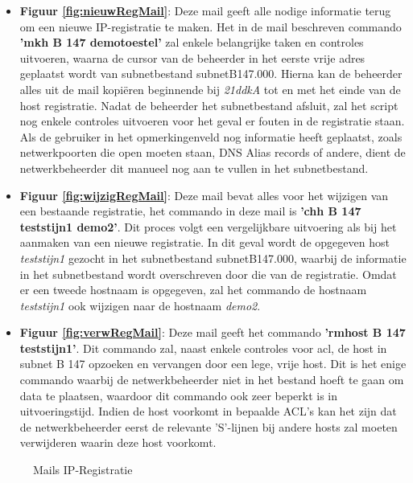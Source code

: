 \begin{itemize}
    \item \textbf{Figuur \ref{fig:nieuwRegMail}}: Deze mail geeft alle nodige informatie terug om een nieuwe IP-registratie te maken. Het in de mail beschreven commando \\\textbf{'mkh B 147 demotoestel'} zal enkele belangrijke taken en controles uitvoeren, waarna de cursor van de beheerder in het eerste vrije adres geplaatst wordt van subnetbestand subnetB147.000. Hierna kan de beheerder alles uit de mail kopiëren beginnende bij \textit{21ddkA} tot en met het einde van de host registratie. Nadat de beheerder het subnetbestand afsluit, zal het script nog enkele controles uitvoeren voor het geval er fouten in de registratie staan. Als de gebruiker in het opmerkingenveld nog informatie heeft geplaatst, zoals netwerkpoorten die open moeten staan, DNS Alias records of andere, dient de netwerkbeheerder dit manueel nog aan te vullen in het subnetbestand.
    \item \textbf{Figuur \ref{fig:wijzigRegMail}}: Deze mail bevat alles voor het wijzigen van een bestaande registratie, het commando in deze mail is \textbf{'chh B 147 teststijn1 demo2'}. Dit proces volgt een vergelijkbare uitvoering als bij het aanmaken van een nieuwe registratie. In dit geval wordt de opgegeven host \textit{teststijn1} gezocht in het subnetbestand subnetB147.000, waarbij de informatie in het subnetbestand wordt overschreven door die van de registratie. Omdat er een tweede hostnaam is opgegeven, zal het commando de hostnaam \textit{teststijn1} ook wijzigen naar de hostnaam \textit{demo2}.
    \item \textbf{Figuur \ref{fig:verwRegMail}}: Deze mail geeft het commando \textbf{'rmhost B 147 teststijn1'}. Dit commando zal, naast enkele controles voor \acrshort{acl}, de host in subnet B 147 opzoeken en vervangen door een lege, vrije host. Dit is het enige commando waarbij de netwerkbeheerder niet in het bestand hoeft te gaan om data te plaatsen, waardoor dit commando ook zeer beperkt is in uitvoeringstijd. Indien de host voorkomt in bepaalde ACL's kan het zijn dat de netwerkbeheerder eerst de relevante 'S'-lijnen bij andere hosts zal moeten verwijderen waarin deze host voorkomt.
\end{itemize}

\begin{figure}[H]
    \hspace*{\fill}
    \hspace*{\fill}
    \caption{Mails IP-Registratie}
    \label{fig:netadminMail}
\end{figure}

